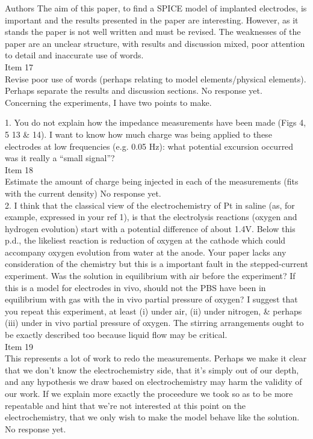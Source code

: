 \documentclass[journal, a4paper]{IEEEtran}
\begin{document}
{\color{blue}
Authors
The aim of this paper, to find a SPICE model of implanted electrodes, is important and the results presented in the paper are interesting. However, as it stands the paper is not well written and must be revised. The weaknesses of the paper are an unclear structure, with results and discussion mixed, poor attention to detail and inaccurate use of words.\\
{\color{OliveGreen}
    Item 17\\
    {\color{Red} Revise poor use of words (perhaps relating to model elements/physical elements). Perhaps separate the results and discussion sections.} 
    No response yet.
}\\

Concerning the experiments, I have two points to make.

1. You do not explain how the impedance measurements have been made (Figs 4, 5 13 & 14). I want to know how much charge was being applied to these electrodes at low frequencies (e.g. 0.05 Hz): what potential excursion occurred was it really a ``small signal''?\\
{\color{OliveGreen}
    Item 18\\
    {\color{Red} Estimate the amount of charge being injected in each of the measurements (fits with the current density)}
    No response yet.
}\\

2. I think that the classical view of the electrochemistry of Pt in saline (as, for example, expressed in your ref 1), is that the electrolysis reactions (oxygen and hydrogen evolution) start with a potential difference of about 1.4V. Below this p.d., the likeliest reaction is reduction of oxygen at the cathode which could accompany oxygen evolution from water at the anode. Your paper lacks any consideration of the chemistry but this is a important fault in the stepped-current experiment. Was the solution in equilibrium with air before the experiment? If this is a model for electrodes in vivo, should not the PBS have been in equilibrium with gas with the in vivo partial pressure of oxygen? I suggest that you repeat this experiment, at least (i) under air, (ii) under nitrogen, & perhaps (iii) under in vivo partial pressure of oxygen. The stirring arrangements ought to be exactly described too because liquid flow may be critical.\\
{\color{OliveGreen}
    Item 19\\
    {\color{Red} This represents a lot of work to redo the measurements. Perhaps we make it clear that we don't know the electrochemistry side, that it's simply out of our depth, and any hypothesis we draw based on electrochemistry may harm the validity of our work. If we explain more exactly the proceedure we took so as to be more repeatable and hint that we're not interested at this point on the electrochemistry, that we only wish to make the model behave like the solution.}
    No response yet.
}

}
\end{document}
